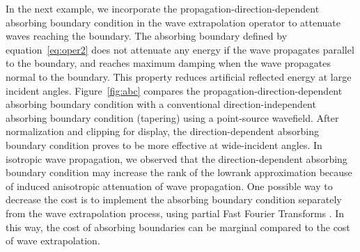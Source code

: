 In the next example, we incorporate the propagation-direction-dependent absorbing boundary condition in the wave extrapolation operator to attenuate waves reaching the boundary. The absorbing boundary defined by equation~\ref{eq:oper2} does not attenuate any energy if the wave propagates parallel to the boundary, and reaches maximum damping when the wave propagates normal to the boundary. This property reduces artificial reflected energy at large incident angles. Figure~\ref{fig:abc} compares the propagation-direction-dependent absorbing boundary condition with a conventional direction-independent absorbing boundary condition (tapering) using a point-source wavefield. After normalization and clipping for display, the direction-dependent absorbing boundary condition proves to be more effective at wide-incident angles. In isotropic wave propagation, we observed that the direction-dependent absorbing boundary condition may increase the rank of the lowrank approximation because of induced anisotropic attenuation of wave propagation.  One possible way to decrease the cost is to implement the absorbing boundary condition separately from the wave extrapolation process, using partial Fast Fourier Transforms \cite[]{ying09}. In this way, the cost of absorbing boundaries can be marginal compared to the cost of wave extrapolation.

